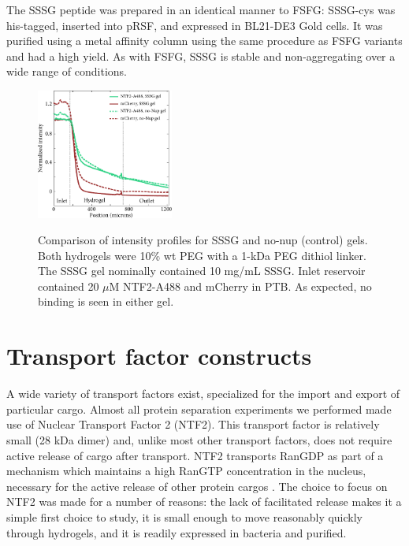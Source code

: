 The SSSG peptide was prepared in an identical manner to FSFG: SSSG-cys was his-tagged, inserted into pRSF, and expressed in BL21-DE3 Gold cells.  It was purified using a metal  affinity column using the same procedure as FSFG variants and had a high yield.  As with FSFG, SSSG is stable and non-aggregating over a wide range of conditions.
\begin{figure} %
\caption[SSSG as a nonbinding Nup.]{Comparison of intensity profiles for SSSG and no-nup (control) gels. Both hydrogels were 10\% wt PEG with a 1-kDa PEG dithiol linker.  The SSSG gel nominally contained 10 mg/mL SSSG.  Inlet reservoir contained 20 $\mu$M NTF2-A488 and mCherry in PTB.  As expected, no binding is seen in either gel.\\}
\centering
\includegraphics[width=0.4\textwidth]{figs/ch03/SSSG-control-comparison}
\label{fig:SSSG-control-comparison}
\end{figure} 

\section{Transport factor constructs}

A wide variety of transport factors exist, specialized for the import and export of particular cargo.  Almost all protein separation experiments we performed made use of Nuclear Transport Factor 2 (NTF2).  This transport factor is relatively small (28 kDa dimer) and, unlike most other transport factors, does not require active release of cargo after transport. NTF2 transports RanGDP as part of a mechanism which maintains a high RanGTP concentration in the nucleus, necessary for the active release of other protein cargos \cite{ribbeck98}.  The choice to focus on NTF2 was made for a number of reasons: the lack of facilitated release makes it a simple first choice to study, it is small enough to move reasonably quickly through hydrogels, and it is readily expressed in bacteria and purified.

